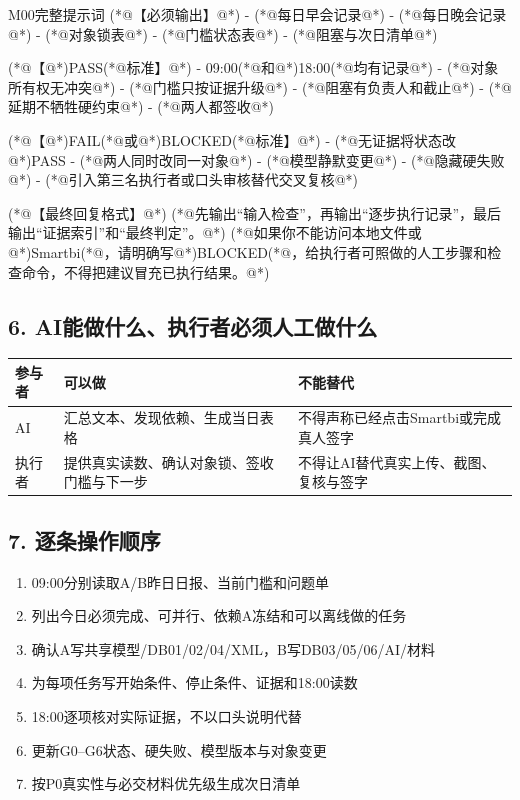 \documentclass[UTF8,openany,zihao=-4]{ctexbook}
\renewcommand{\_}{\textunderscore\allowbreak}
\begin{document}
\begin{PromptBox}{M00完整提示词}
(*@{\promptcjk 【必须输出】}@*)
- (*@{\promptcjk 每日早会记录}@*)
- (*@{\promptcjk 每日晚会记录}@*)
- (*@{\promptcjk 对象锁表}@*)
- (*@{\promptcjk 门槛状态表}@*)
- (*@{\promptcjk 阻塞与次日清单}@*)

(*@{\promptcjk 【}@*)PASS(*@{\promptcjk 标准】}@*)
- 09:00(*@{\promptcjk 和}@*)18:00(*@{\promptcjk 均有记录}@*)
- (*@{\promptcjk 对象所有权无冲突}@*)
- (*@{\promptcjk 门槛只按证据升级}@*)
- (*@{\promptcjk 阻塞有负责人和截止}@*)
- (*@{\promptcjk 延期不牺牲硬约束}@*)
- (*@{\promptcjk 两人都签收}@*)

(*@{\promptcjk 【}@*)FAIL(*@{\promptcjk 或}@*)BLOCKED(*@{\promptcjk 标准】}@*)
- (*@{\promptcjk 无证据将状态改}@*)PASS
- (*@{\promptcjk 两人同时改同一对象}@*)
- (*@{\promptcjk 模型静默变更}@*)
- (*@{\promptcjk 隐藏硬失败}@*)
- (*@{\promptcjk 引入第三名执行者或口头审核替代交叉复核}@*)

(*@{\promptcjk 【最终回复格式】}@*)
(*@{\promptcjk 先输出“输入检查”，再输出“逐步执行记录”，最后输出“证据索引”和“最终判定”。}@*)
(*@{\promptcjk 如果你不能访问本地文件或}@*)Smartbi(*@{\promptcjk ，请明确写}@*)BLOCKED(*@{\promptcjk ，给执行者可照做的人工步骤和检查命令，不得把建议冒充已执行结果。}@*)
\end{PromptBox}

\subsection*{6. AI能做什么、执行者必须人工做什么}
\noindent\begin{tabularx}{\textwidth}{@{}p{}XX@{}}
\toprule
\textbf{参与者} & \textbf{可以做} & \textbf{不能替代} \\
\midrule
AI & 汇总文本、发现依赖、生成当日表格 & 不得声称已经点击Smartbi或完成真人签字 \\
执行者 & 提供真实读数、确认对象锁、签收门槛与下一步 & 不得让AI替代真实上传、截图、复核与签字 \\
\bottomrule
\end{tabularx}

\subsection*{7. 逐条操作顺序}
\begin{enumerate}
\item 09:00分别读取A/B昨日日报、当前门槛和问题单
\item 列出今日必须完成、可并行、依赖A冻结和可以离线做的任务
\item 确认A写共享模型/DB01/02/04/XML，B写DB03/05/06/AI/材料
\item 为每项任务写开始条件、停止条件、证据和18:00读数
\item 18:00逐项核对实际证据，不以口头说明代替
\item 更新G0--G6状态、硬失败、模型版本与对象变更
\item 按P0真实性与必交材料优先级生成次日清单
\end{enumerate}
\end{document}
